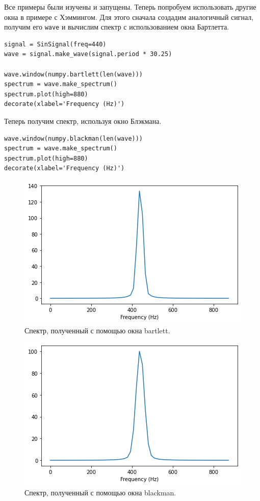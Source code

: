 \documentclass[a4paper, 14pt]{extarticle}
\begin{document}
    Все примеры были изучены и запущены. Теперь попробуем использовать другие окна в примере с Хэммингом.
    Для этого сначала создадим аналогичный сигнал, получим его \texttt{wave} и вычислим спектр с использованием окна Бартлетта.

    \begin{lstlisting}[caption= Создание сигнала и получение спектра с использованием \texttt{bartlett}., label={lst:task1_leakage_bartlett}]
signal = SinSignal(freq=440)
wave = signal.make_wave(signal.period * 30.25)

wave.window(numpy.bartlett(len(wave)))
spectrum = wave.make_spectrum()
spectrum.plot(high=880)
decorate(xlabel='Frequency (Hz)')
    \end{lstlisting}

    Теперь получим спектр, используя окно Блэкмана.

    \begin{lstlisting}[caption= Получение спектра с использованием \texttt{blackman}., label={lst:task1_leakage_blackman}]
wave.window(numpy.blackman(len(wave)))
spectrum = wave.make_spectrum()
spectrum.plot(high=880)
decorate(xlabel='Frequency (Hz)')
    \end{lstlisting}

    \begin{figure}[H]
        \centering
        \includegraphics[width=0.8\linewidth]{resources/Images/task1_leakage_bartlett}
        \caption{Спектр, полученный с помощью окна bartlett.}
        \label{fig:task1_leakage_bartlett}
    \end{figure}

    \begin{figure}[H]
        \centering
        \includegraphics[width=0.8\linewidth]{resources/Images/task1_leakage_blackman}
        \caption{Спектр, полученный с помощью окна blackman.}
        \label{fig:task1_leakage_blackman}
    \end{figure}
\end{document}
